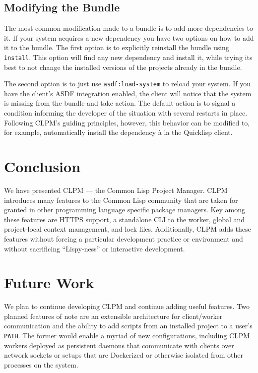 \documentclass[sigconf]{acmart}
\begin{document}
\subsection{Modifying the Bundle}

The most common modification made to a bundle is to add more dependencies to
it. If your system acquires a new dependency you have two options on how to add
it to the bundle. The first option is to explicitly reinstall the bundle using
{\tt install}. This option will find any new dependency and install it, while
trying its best to not change the installed versions of the projects already in
the bundle.

The second option is to just use {\tt asdf:load-system} to reload your
system. If you have the client's ASDF integration enabled, the client will
notice that the system is missing from the bundle and take action. The default
action is to signal a condition informing the developer of the situation with
several restarts in place. Following CLPM's guiding principles, however, this
behavior can be modified to, for example, automatically install the dependency
\`a la the Quicklisp client.

\section{Conclusion}

We have presented CLPM --- the Common Lisp Project Manager. CLPM introduces
many features to the Common Lisp community that are taken for granted in other
programming language specific package managers. Key among these features are
HTTPS support, a standalone CLI to the worker, global and project-local context
management, and lock files. Additionally, CLPM adds these features without
forcing a particular development practice or environment and without
sacrificing ``Lispy-ness'' or interactive development.

\section{Future Work}

We plan to continue developing CLPM and continue adding useful features. Two
planned features of note are an extensible architecture for client/worker
communication and the ability to add scripts from an installed project to a
user's {\tt PATH}. The former would enable a myriad of new configurations,
including CLPM workers deployed as persistent daemons that communicate with
clients over network sockets or setups that are Dockerized or otherwise
isolated from other processes on the system.
\end{document}
